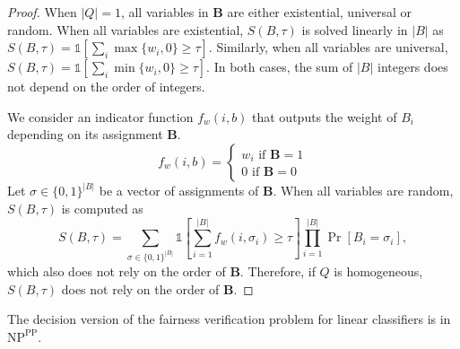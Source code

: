 		\begin{proof}
			When $ |Q|  = 1 $, all variables in $\mathbf{B}$ are either existential, universal or random. When all variables are existential, $ S(B,\tau) $ is solved linearly in $ |B| $ as $ S(B, \tau) = \mathds{1}[\sum_i \max\{w_i, 0\} \ge \tau] $. Similarly, when all variables are universal, $ S(B, \tau) = \mathds{1}[\sum_i \min\{w_i, 0\} \ge \tau] $. In both cases,  the sum of $ |B| $ integers does not depend on the order of integers.
			
			We consider an indicator function $ f_w(i, b) $ that outputs the weight of $ B_i $ depending on its assignment $\mathbf{B}$. 
			\[
			f_w(i, b) = \begin{cases}
			w_i \text{ if }\mathbf{B}= 1 \\
			0 \text{ if }\mathbf{B}= 0
			\end{cases}
			\]
			Let $ \sigma \in \{0,1\}^{|B|} $ be a vector of  assignments of $\mathbf{B}$. When all variables are random, $ S(B, \tau) $ is computed as
			\[ S(B, \tau) = \sum_{\sigma \in \{0,1\}^{|B|}}  \mathds{1}[\sum_{i=1}^{|B|} f_w(i, \sigma_i) \ge \tau] \prod_{i=1}^{|B|}\Pr[B_i = \sigma_i], \]
			which also does not rely on the order of $\mathbf{B}$. Therefore, if $ Q $ is homogeneous, $ S(B,\tau) $ does not rely on the order of $\mathbf{B}$.
			
			
			
		\end{proof}
	\fi
	
		\begin{lemmarep}
			The decision version of the fairness verification problem for linear classifiers is in $\mathrm{NP^{PP}}$.
		\end{lemmarep}
	
